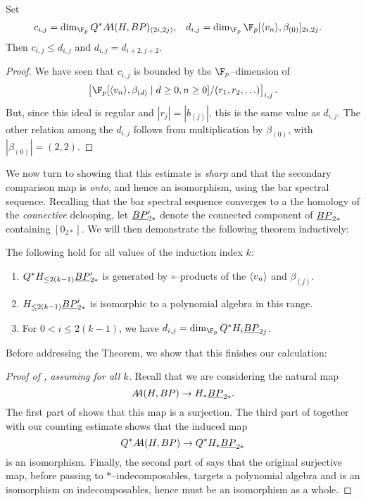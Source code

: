 \begin{corollary}
Set
\begin{align*}
c_{i,j} & = \dim_{\F_p} Q^* \AA(H, BP)_{(2i, 2j)}, &
d_{i,j} & = \dim_{\F_p} \F_p[\<v_n\>, \beta_{(0)}]_{2i,2j}.
\end{align*}
Then \(c_{i,j} \le d_{i,j}\) and \(d_{i,j} = d_{i+2,j+2}\).
\end{corollary}
\begin{proof}
We have seen that \(c_{i,j}\) is bounded by the \(\F_p\)--dimension of \[\left[\F_p[\<v_n\>, \beta_{(d)} \mid d \ge 0, n \ge 0] / (r_1, r_2, \ldots)\right]_{i,j}.\]  But, since this ideal is regular and \(|r_j| = |b_{(j)}|\), this is the same value as \(d_{i,j}\).  The other relation among the \(d_{i,j}\) follows from multiplication by \(\beta_{(0)}\), with \(|\beta_{(0)}| = (2, 2)\).
\end{proof}

We now turn to showing that this estimate is \emph{sharp} and that the secondary comparison map is \emph{onto}, and hence an isomorphism, using the bar spectral sequence.  Recalling that the bar spectral sequence converges to a the homology of the \emph{connective} delooping, let \(\underline{\smash{BP}}_{2*}'\) denote the connected component of \(\underline{\smash{BP}}_{2*}\) containing \([0_{2*}]\).  We will then demonstrate the following theorem inductively:
\begin{theorem}\label{HFpBPCooperationsInduction}
The following hold for all values of the induction index \(k\):
\begin{enumerate}
\item \(Q^* H_{\le 2(k-1)} \underline{\smash{BP}}_{2*}'\) is generated by \(\circ\)--products of the \(\langle v_n\rangle\) and \(\beta_{(j)}\).
\item \(H_{\le 2(k-1)} \underline{\smash{BP}}_{2*}'\) is isomorphic to a polynomial algebra in this range.
\item For \(0 < i \le 2(k-1)\), we have \(d_{i,j} = \dim_{\F_p} Q^* H_i \OS{BP}{2j}\).
\end{enumerate}
\end{theorem}

\noindent Before addressing the Theorem, we show that this finishes our calculation:
\begin{proof}[{Proof of , assuming  for all \(k\)}]
Recall that we are considering the natural map \[A\!\!A(H, BP) \to H_* \underline{\smash{BP}}_{2*}.\]  The first part of  shows that this map is a surjection.  The third part of  together with our counting estimate shows that the induced map \[Q^* A\!\!A(H, BP) \to Q^* H_* \underline{\smash{BP}}_{2*}\] is an isomorphism.  Finally, the second part of  says that the original surjective map, before passing to \(\ast\)--indecomposables, targets a polynomial algebra and is an isomorphism on indecomposables, hence must be an isomorphism as a whole.
\end{proof}


